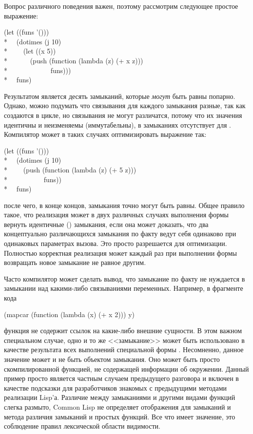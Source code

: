 \begin{defspec}
Вопрос различного поведения важен, поэтому рассмотрим следующее простое выражение:
\begin{lisp}
(let ((funs '())) \\*
~~(dotimes (j 10) \\*
~~~~(let ((x 5)) \\*
~~~~~~(push (function (lambda (z) (+ x z))) \\*
~~~~~~~~~~~~funs))) \\*
~~funs)
\end{lisp}
Результатом является десять замыканий, которые \emph{могут} быть равны 
попарно. Однако, можно подумать что связывания  для каждого замыкания разные, так
как создаются в цикле, но связывания не могут различатся, потому что их значения
идентичны и неизменяемы (иммутабельны), в замыканиях отсутствует  для
.
Компилятор может в таких случаях оптимизировать выражение так:
\begin{lisp}
(let ((funs '())) \\*
~~(dotimes (j 10) \\*
~~~~(push (function (lambda (z) (+ 5 z))) \\*
~~~~~~~~~~funs)) \\*
~~funs)
\end{lisp}
после чего, в конце концов, замыкания точно могут быть равны.
Общее правило такое, что реализация может в двух различных случаях выполнения
формы  вернуть идентичные () замыкания, если она может
доказать, что два концептуально различающихся замыкания по факту ведут себя
одинаково при одинаковых параметрах вызова.
Это просто разрешается для оптимизации. Полностью корректная реализация может
каждый раз при выполнении формы  возвращать новое замыкание не
равное  другим.

Часто компилятор может сделать вывод, что замыкание по факту не нуждается в
замыкании над какими-либо связываниями переменных. Например,
в фрагменте кода
\begin{lisp}
(mapcar (function (lambda (x) (+ x 2))) y)
\end{lisp}
функция  не содержит ссылок на какие-либо внешние
сущности. В этом важном специальном случае, одно и то же <<замыкание>> может
быть использовано в качестве результата всех выполнений специальной формы
.
Несомненно, данное значение может и не быть объектом замыкания. Оно может быть
просто скомпилированной функцией, не содержащей информации об окружении.
Данный пример просто является частным случаем предыдущего разговора и включен в
качестве подсказки для разработчиков знакомых с предыдущими методами реализации
Lisp'а. Различие между замыканиями и другими видами функций слегка размыто,
Common Lisp не определяет отображения для замыканий и метода различия замыканий
и простых функций. Все что имеет значение, это соблюдение правил лексической
области видимости.


\end{defspec}
